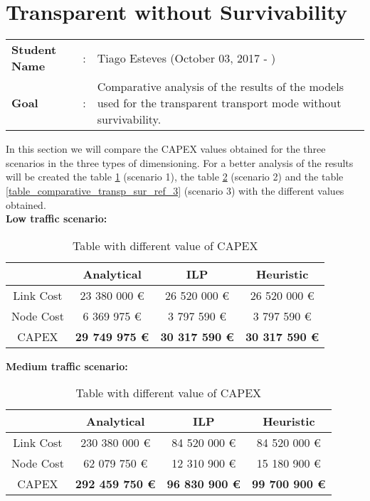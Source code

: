 \clearpage

\section{Transparent without Survivability}\label{comparative_Transp_Survivability}
\begin{tcolorbox}	
\begin{tabular}{p{2.75cm} p{0.2cm} p{10.5cm}} 	
\textbf{Student Name}  &:& Tiago Esteves    (October 03, 2017 - )\\
\textbf{Goal}          &:& Comparative analysis of the results of the models used for the transparent transport mode without survivability.
\end{tabular}
\end{tcolorbox}
\vspace{11pt}


In this section we will compare the CAPEX values obtained for the three scenarios in the three types of dimensioning. For a better analysis of the results will be created the table \ref{table_comparative_transp_sur_ref_1} (scenario 1), the table \ref{table_comparative_transp_sur_ref_2} (scenario 2) and the table \ref{table_comparative_transp_sur_ref_3} (scenario 3) with the different values obtained.\\

\textbf{Low traffic scenario:}

\begin{table}[h!]
\centering
\begin{tabular}{| c | c | c | c |}
 \hline
   & Analytical & ILP & Heuristic \\
 \hline\hline
 Link Cost & 23 380 000 \euro & 26 520 000 \euro & 26 520 000 \euro \\
 Node Cost & 6 369 975 \euro & 3 797 590 \euro & 3 797 590 \euro \\
 CAPEX & \textbf{29 749 975 \euro} & \textbf{30 317 590 \euro} & \textbf{30 317 590 \euro} \\
 \hline
\end{tabular}
\caption{Table with different value of CAPEX }
\label{table_comparative_transp_sur_ref_1}
\end{table}


\vspace{11pt}
\textbf{Medium traffic scenario:}

\begin{table}[h!]
\centering
\begin{tabular}{| c | c | c | c |}
 \hline
   & Analytical & ILP & Heuristic \\
 \hline\hline
 Link Cost & 230 380 000 \euro & 84 520 000 \euro & 84 520 000 \euro \\
 Node Cost & 62 079 750 \euro & 12 310 900 \euro & 15 180 900 \euro \\
 CAPEX & \textbf{292 459 750 \euro} & \textbf{96 830 900 \euro} & \textbf{99 700 900 \euro} \\
 \hline
\end{tabular}
\caption{Table with different value of CAPEX }
\label{table_comparative_transp_sur_ref_2}
\end{table}


